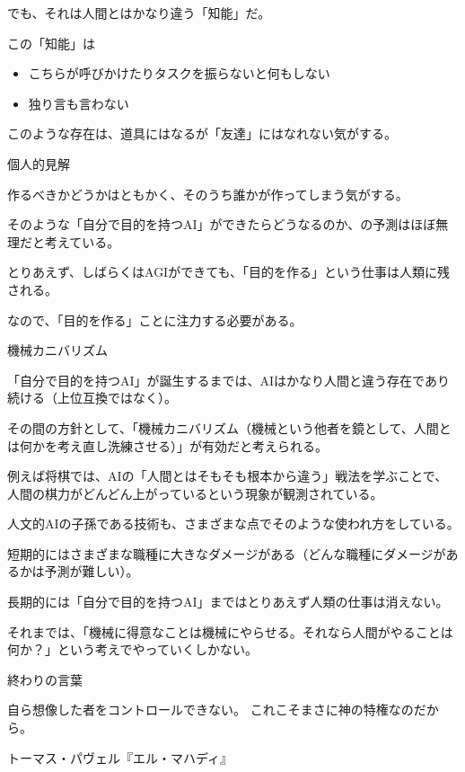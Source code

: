 \documentclass[12pt, unicode]{beamer}
\begin{document}
\begin{frame}

でも、それは人間とはかなり違う「知能」だ。

この「知能」は

\begin{itemize}
\item こちらが呼びかけたりタスクを振らないと何もしない
\item 独り言も言わない
\end{itemize}

このような存在は、道具にはなるが「友達」にはなれない気がする。

\end{frame}

\begin{frame}{個人的見解}

作るべきかどうかはともかく、そのうち誰かが作ってしまう気がする。

そのような「自分で目的を持つAI」ができたらどうなるのか、の予測はほぼ無理だと考えている。

\end{frame}

\begin{frame}

とりあえず、しばらくはAGIができても、「目的を作る」という仕事は人類に残される。

なので、「目的を作る」ことに注力する必要がある。

\end{frame}

\begin{frame}{機械カニバリズム}

「自分で目的を持つAI」が誕生するまでは、AIはかなり人間と違う存在であり続ける（上位互換ではなく）。

その間の方針として、「機械カニバリズム（機械という他者を鏡として、人間とは何かを考え直し洗練させる）」が有効だと考えられる。

例えば将棋では、AIの「人間とはそもそも根本から違う」戦法を学ぶことで、人間の棋力がどんどん上がっているという現象が観測されている。

人文的AIの子孫である技術も、さまざまな点でそのような使われ方をしている。

\end{frame}

\begin{frame}

短期的にはさまざまな職種に大きなダメージがある（どんな職種にダメージがあるかは予測が難しい）。

長期的には「自分で目的を持つAI」まではとりあえず人類の仕事は消えない。

それまでは、「機械に得意なことは機械にやらせる。それなら人間がやることは何か？」という考えでやっていくしかない。

\end{frame}

\begin{frame}{終わりの言葉}

自ら想像した者をコントロールできない。
これこそまさに神の特権なのだから。

トーマス・パヴェル『エル・マハディ』

\end{frame}
\end{document}
